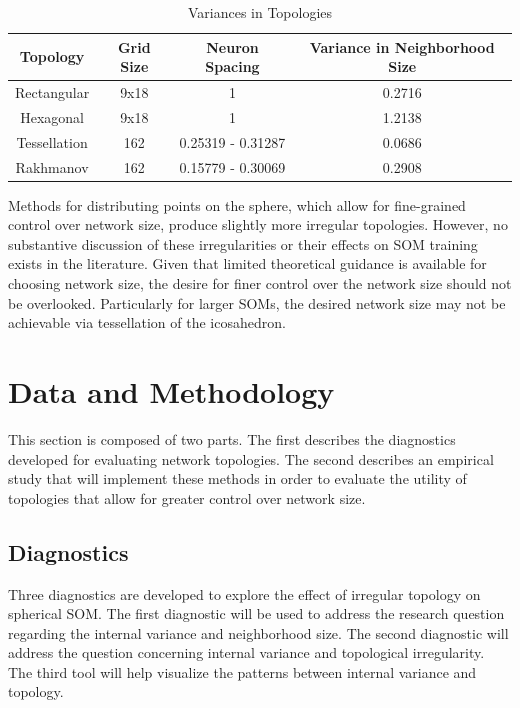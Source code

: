 \documentclass[10pt,titlepage]{article}
\begin{document}
\begin{table}[htbp]
\caption{Variances in Topologies}
\begin{center}
\begin{tabular}{|c|c|c|c|}
\hline
Topology&Grid Size&Neuron Spacing&Variance in Neighborhood Size\\
\hline
Rectangular&9x18&1&0.2716\\
Hexagonal&9x18&1&1.2138\\
Tessellation&162&0.25319 - 0.31287& 0.0686\\
Rakhmanov&162&0.15779 - 0.30069& 0.2908\\
\hline
\end{tabular}
\end{center}
\label{table1}
\end{table}

Methods for distributing points on the sphere, which allow for fine-grained
control over network size, produce slightly more irregular topologies.  However,
no substantive discussion of these irregularities or their effects on SOM
training exists in the literature. Given that limited theoretical guidance is available
for choosing network size, the desire for finer control over the network size
should not be overlooked. Particularly for larger SOMs, the desired network size
may not be achievable via tessellation of the icosahedron.

\section{Data and Methodology}
This section is composed of two parts.  The first describes the diagnostics
developed for evaluating network topologies.  The second describes an
empirical study that will implement these methods in order to evaluate the
utility of topologies that allow for greater control over network size.

\subsection{Diagnostics}
Three diagnostics are developed to explore the effect of irregular topology on
spherical SOM.  The first diagnostic will be used to address the research
question regarding the internal variance and neighborhood size.  The second
diagnostic will address the question concerning internal variance and
topological irregularity.  The third tool will help visualize the patterns
between internal variance and topology.
\end{document}
